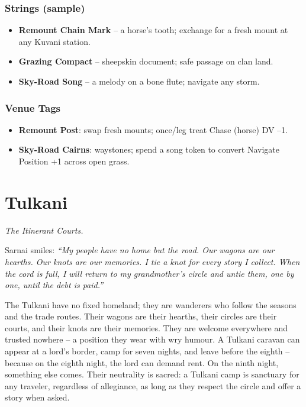 \documentclass[12pt,oneside]{book}
\begin{document}
\subsection*{Strings (sample)}
\begin{itemize}
  \item \textbf{Remount Chain Mark} -- a horse's tooth; exchange for a fresh mount at any Kuvani station.
  \item \textbf{Grazing Compact} -- sheepskin document; safe passage on clan land.
  \item \textbf{Sky-Road Song} -- a melody on a bone flute; navigate any storm.
\end{itemize}

\subsection*{Venue Tags}
\begin{itemize}
  \item \textbf{Remount Post}: swap fresh mounts; once/leg treat Chase (horse) DV --1.
  \item \textbf{Sky-Road Cairns}: waystones; spend a song token to convert Navigate Position +1 across open grass.
\end{itemize}

\newpage

\newpage

\chapter{Tulkani}
\emph{The Itinerant Courts.}

\noindent
Sarnai smiles: \textit{``My people have no home but the road. Our wagons are our hearths. Our knots are our memories. I tie a knot for every story I collect. When the cord is full, I will return to my grandmother's circle and untie them, one by one, until the debt is paid.''}

\noindent
The Tulkani have no fixed homeland; they are wanderers who follow the seasons and the trade routes. Their wagons are their hearths, their circles are their courts, and their knots are their memories. They are welcome everywhere and trusted nowhere -- a position they wear with wry humour. A Tulkani caravan can appear at a lord's border, camp for seven nights, and leave before the eighth -- because on the eighth night, the lord can demand rent. On the ninth night, something else comes. Their neutrality is sacred: a Tulkani camp is sanctuary for any traveler, regardless of allegiance, as long as they respect the circle and offer a story when asked.
\end{document}
